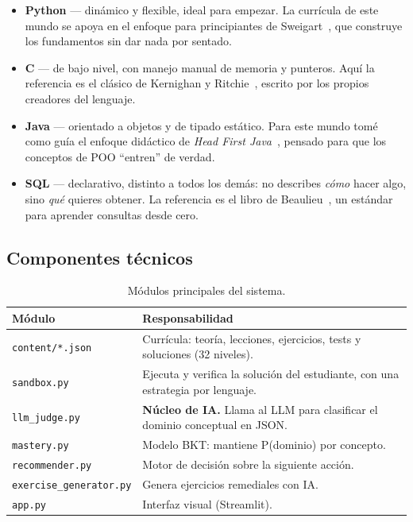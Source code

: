 \documentclass[11pt,letterpaper]{article}
\begin{document}
\begin{itemize}[leftmargin=*]
  \item \textbf{Python} --- dinámico y flexible, ideal para empezar. La
  currícula de este mundo se apoya en el enfoque para principiantes de
  Sweigart~\cite{sweigart}, que construye los fundamentos sin dar nada
  por sentado.
  \item \textbf{C} --- de bajo nivel, con manejo manual de memoria y
  punteros. Aquí la referencia es el clásico de Kernighan y
  Ritchie~\cite{kr}, escrito por los propios creadores del lenguaje.
  \item \textbf{Java} --- orientado a objetos y de tipado estático. Para
  este mundo tomé como guía el enfoque didáctico de \textit{Head First
  Java}~\cite{headfirst}, pensado para que los conceptos de POO
  ``entren'' de verdad.
  \item \textbf{SQL} --- declarativo, distinto a todos los demás: no
  describes \textit{cómo} hacer algo, sino \textit{qué} quieres
  obtener. La referencia es el libro de Beaulieu~\cite{beaulieu}, un
  estándar para aprender consultas desde cero.
\end{itemize}

\subsection{Componentes técnicos}
\begin{table}[H]
\centering
\small
\begin{tabular}{@{}p{4cm}p{9cm}@{}}
\toprule
\textbf{Módulo} & \textbf{Responsabilidad} \\
\midrule
\texttt{content/*.json} & Currícula: teoría, lecciones, ejercicios,
tests y soluciones (32 niveles). \\
\texttt{sandbox.py} & Ejecuta y verifica la solución del estudiante,
con una estrategia por lenguaje. \\
\texttt{llm\_judge.py} & \textbf{Núcleo de IA.} Llama al LLM para
clasificar el dominio conceptual en JSON. \\
\texttt{mastery.py} & Modelo BKT: mantiene P(dominio) por concepto. \\
\texttt{recommender.py} & Motor de decisión sobre la siguiente
acción. \\
\texttt{exercise\_generator.py} & Genera ejercicios remediales con IA. \\
\texttt{app.py} & Interfaz visual (Streamlit). \\
\bottomrule
\end{tabular}
\caption{Módulos principales del sistema.}
\end{table}
\end{document}
